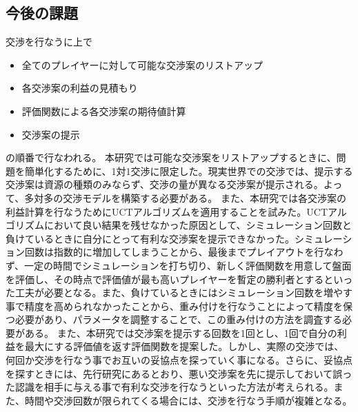 \documentclass[a4, 10pt,dvipdfmx]{jsarticle}
\begin{document}
\subsection{今後の課題}
交渉を行なうに上で

\begin{itemize}
 \item 全てのプレイヤーに対して可能な交渉案のリストアップ
 \item 各交渉案の利益の見積もり
 \item 評価関数による各交渉案の期待値計算
 \item 交渉案の提示
\end{itemize}
の順番で行なわれる。
本研究では可能な交渉案をリストアップするときに、問題を簡単化するために、1対1交渉に限定した。現実世界での交渉では、提示する交渉案は資源の種類のみならず、交渉の量が異なる交渉案が提示される。よって、多対多の交渉モデルを構築する必要がある。
また、本研究では各交渉案の利益計算を行なうためにUCTアルゴリズムを適用することを試みた。UCTアルゴリズムにおいて良い結果を残せなかった原因として、シミュレーション回数と負けているときに自分にとって有利な交渉案を提示できなかった。シミュレーション回数は指数的に増加してしまうことから、最後までプレイアウトを行なわず、一定の時間でシミュレーションを打ち切り、新しく評価関数を用意して盤面を評価し、その時点で評価値が最も高いプレイヤーを暫定の勝利者とするといった工夫が必要となる。また、負けているときにはシミュレーション回数を増やす事で精度を高められなかったことから、重み付けを行なうことによって精度を保つ必要があり、パラメータを調整することで、この重み付けの方法を調査する必要がある。
また、本研究では交渉案を提示する回数を1回とし、1回で自分の利益を最大にする評価値を返す評価関数を提案した。しかし、実際の交渉では、何回か交渉を行なう事でお互いの妥協点を探っていく事になる。さらに、妥協点を探すときには、先行研究にあるとおり、悪い交渉案を先に提示しておいて誤った認識を相手に与える事で有利な交渉を行なうといった方法が考えられる。また、時間や交渉回数が限られてくる場合には、交渉を行なう手順が複雑となる。



\end{document}
